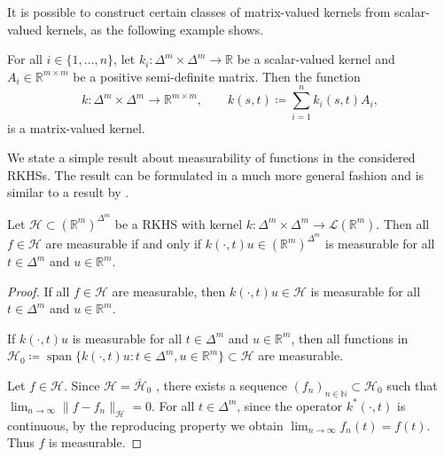 \documentclass{article}
\DeclareMathOperator{\Span}{span}
\begin{document}
It is possible to construct certain classes of matrix-valued kernels from
scalar-valued kernels, as the following example shows.

\begin{example}\label{ex:lifted_kernel}
  For all $i \in \{1, \ldots, n\}$, let
  $k_i \colon \Delta^m \times \Delta^m \to \mathbb{R}$ be a scalar-valued kernel
  and $A_i \in \mathbb{R}^{m \times m}$ be a positive semi-definite matrix. Then
  the function
  \begin{equation}\label{eq:lifted_kernel}
    k \colon \Delta^m \times \Delta^m \to \mathbb{R}^{m \times m}, \qquad k(s, t) \coloneqq \sum_{i=1}^n k_i(s, t) A_i,
  \end{equation}
  is a matrix-valued kernel.
\end{example}

We state a simple result about measurability of functions in the considered
RKHSs. The result can be formulated in a much more general fashion and is
similar to a result by \citet[Lemma~4.24]{christmann08_suppor_vector_machin}.

\begin{lemma}\label{lemma:rkhs_measurable}
  Let $\mathcal{H} \subset {(\mathbb{R}^m)}^{\Delta^m}$ be a RKHS with kernel
  $k \colon \Delta^m \times \Delta^m \to \mathcal{L}(\mathbb{R}^m)$. Then all
  $f \in \mathcal{H}$ are measurable if and only if
  $k(\cdot, t)u \in {(\mathbb{R}^m)}^{\Delta^m}$ is measurable for all
  $t \in \Delta^m$ and $u \in \mathbb{R}^m$.
\end{lemma}

\begin{proof}
  If all $f \in \mathcal{H}$ are measurable, then $k(\cdot, t)u \in \mathcal{H}$
  is measurable for all $t \in \Delta^m$ and $u \in \mathbb{R}^m$.

  If $k(\cdot, t)u$ is measurable for all $t \in \Delta^m$ and
  $u \in \mathbb{R}^m$, then all functions in
  $\mathcal{H}_0 \coloneqq \Span{\{k(\cdot, t)u \colon t \in \Delta^m, u \in \mathbb{R}^m\}} \subset \mathcal{H}$
  are measurable.

  Let $f \in \mathcal{H}$. Since $\mathcal{H} = \overline{\mathcal{H}}_0$
  \citep[see, e.g.,][]{carmeli10_vector_valued_reprod_kernel_hilber_spaces_univer},
  there exists a sequence $(f_n)_{n \in \mathbb{N}} \subset \mathcal{H}_0$ such
  that $\lim_{n \to \infty} \|f - f_n\|_{\mathcal{H}} = 0$. For all
  $t \in \Delta^m$, since the operator $k^*(\cdot, t)$ is continuous, by the
  reproducing property we obtain $\lim_{n \to \infty} f_n(t) = f(t)$. Thus $f$
  is measurable.
\end{proof}
\end{document}
